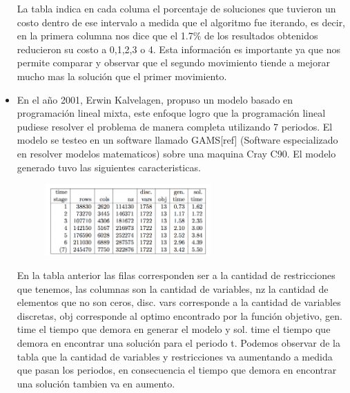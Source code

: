 \documentclass[spanish, fleqn]{article}
\begin{document}
\begin{itemize}
La tabla indica en cada columa el porcentaje de soluciones que tuvieron un costo dentro de ese intervalo a medida que  el algoritmo fue iterando, es decir, en la primera columna nos dice que el 1.7$\%$ de los resultados obtenidos reducieron su costo a 0,1,2,3 o 4. Esta información es importante ya que nos permite comparar y observar que el segundo movimiento tiende a mejorar mucho mas la solución que el primer movimiento. 

\item En el año 2001, Erwin Kalvelagen, propuso un modelo basado en programación lineal mixta, este enfoque logro que la programación lineal pudiese resolver el problema de manera completa utilizando 7 periodos. El modelo se testeo en un software llamado GAMS[ref] (Software especializado en resolver modelos matematicos) sobre una maquina Cray C90. El modelo generado tuvo las siguientes caracteristicas.

\begin{figure}[!h]
  \centering
    \includegraphics[width=0.6\textwidth]{5}
  \label{fig:DiagramaBarra5}
\end{figure}

En la tabla anterior las filas corresponden ser a la cantidad de restricciones que tenemos, las columnas son la cantidad de variables, nz la cantidad de elementos que no son ceros, disc. vars corresponde a la cantidad de variables discretas, obj corresponde al optimo encontrado por la función objetivo, gen. time el tiempo que demora en generar el modelo y sol. time el tiempo que demora en encontrar una solución para el periodo t. Podemos observar de la tabla que la cantidad de variables y restricciones va aumentando a medida que pasan los periodos, en consecuencia el tiempo que demora en encontrar una solución tambien va en aumento.



\end{itemize}



\end{document}
